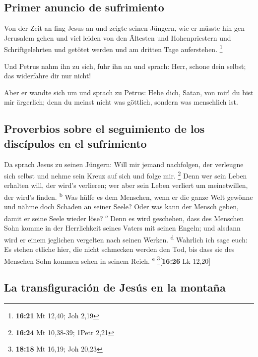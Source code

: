 \hypertarget{primer-anuncio-de-sufrimiento}{%
\subsection{Primer anuncio de
sufrimiento}\label{primer-anuncio-de-sufrimiento}}

 Von der Zeit an fing Jesus an und zeigte seinen Jüngern,
wie er müsste hin gen Jerusalem gehen und viel leiden von den Ältesten
und Hohenpriestern und Schriftgelehrten und getötet werden und am
dritten Tage auferstehen. \footnote{\textbf{16:21} Mt 12,40; Joh 2,19}

 Und Petrus nahm ihn zu sich, fuhr ihn an und sprach:
Herr, schone dein selbst; das widerfahre dir nur nicht!

 Aber er wandte sich um und sprach zu Petrus: Hebe dich,
Satan, von mir! du bist mir ärgerlich; denn du meinst nicht was
göttlich, sondern was menschlich ist.

\hypertarget{proverbios-sobre-el-seguimiento-de-los-discuxedpulos-en-el-sufrimiento}{%
\subsection{Proverbios sobre el seguimiento de los discípulos en el
sufrimiento}\label{proverbios-sobre-el-seguimiento-de-los-discuxedpulos-en-el-sufrimiento}}

 Da sprach Jesus zu seinen Jüngern: Will mir jemand
nachfolgen, der verleugne sich selbst und nehme sein Kreuz auf sich und
folge mir. \footnote{\textbf{16:24} Mt 10,38-39; 1Petr 2,21}
 Denn wer sein Leben erhalten will, der wird's verlieren;
wer aber sein Leben verliert um meinetwillen, der wird's finden.
\textsuperscript{b}  Was hülfe es dem Menschen, wenn er
die ganze Welt gewönne und nähme doch Schaden an seiner Seele? Oder was
kann der Mensch geben, damit er seine Seele wieder löse?
\textsuperscript{c}  Denn es wird geschehen, dass des
Menschen Sohn komme in der Herrlichkeit seines Vaters mit seinen Engeln;
und alsdann wird er einem jeglichen vergelten nach seinen Werken.
\textsuperscript{d}  Wahrlich ich sage euch: Es stehen
etliche hier, die nicht schmecken werden den Tod, bis dass sie des
Menschen Sohn kommen sehen in seinem Reich. \textsuperscript{e}
\footnote{\textbf{18:18} Mt 16,19; Joh 20,23}{[}\textbf{16:26} Lk
12,20{]}

\hypertarget{la-transfiguraciuxf3n-de-jesuxfas-en-la-montauxf1a}{%
\subsection{La transfiguración de Jesús en la
montaña}\label{la-transfiguraciuxf3n-de-jesuxfas-en-la-montauxf1a}}

